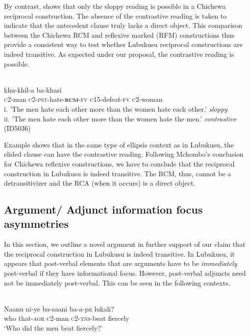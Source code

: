 \documentclass[output=paper]{langsci/langscibook}
\begin{document}
By contrast,  shows that only the sloppy reading is possible in a Chichewa reciprocal construction. The absence of the contrastive reading is taken to indicate that the antecedent clause truly lacks a direct object. This comparison between the Chichewa RCM and reflexive marked (RFM) constructions thus provide a consistent way to test whether Lubukusu reciprocal constructions are indeed transitive. As expected under our proposal, the contrastive reading is possible.


\ea\label{ex:}
\\
   khu-khil-a   ba-khasi \\
\textsc{c}2-man   \textsc{c2-pst}-hate-\textbf{\textsc{rcm}}\textsc{-fv}   \textsc{c}15-defeat-\textsc{fv}   \textsc{c}2-woman  \\
\glt i. 'The men hate each other more than the women hate each other.'  \textit{sloppy} \\
\glt ii. 'The men hate each other more than the women hate the men.'  \textit{contrastive}                       (ID5036)\\
\z

Example  shows that in the same type of ellipsis context as in Lubukusu, the elided clause can have the contrastive reading. Following Mchombo's conclusion for Chichewa reflexive constructions, we have to conclude that the reciprocal construction in Lubukusu is indeed transitive. The RCM, thus, cannot be a detransitivizer and the RCA (when it occurs) is a direct object.

\subsection{Argument/ Adjunct information focus asymmetries}

In this section, we outline a novel argument in further support of our claim that the reciprocal construction in Lubukusu is indeed transitive. In Lubukusu, it appears that post-verbal elements that are arguments have to be \textit{immediately} post-verbal if they have informational focus. However, post-verbal adjuncts need not be immediately post-verbal. This can be seen in the following contexts.



\ea\label{ex:}
  \\
\gll Naanu  ni-ye    ba-saani   ba-a-pa   lukali? \\
who  that-\textsc{agr}   \textsc{c}2-man   \textsc{c}2-\textsc{tns}-beat   fiercely \\
\glt ‘Who did the men beat fiercely?’ \\
\z
\end{document}

